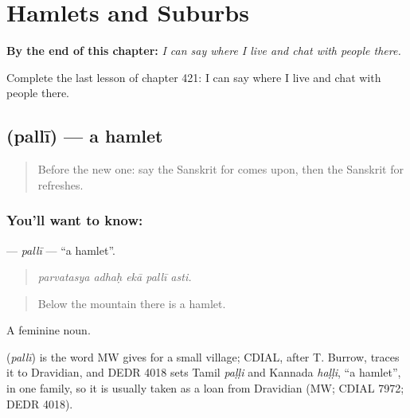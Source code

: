 
\chapter{Hamlets and Suburbs}
\label{ch:sa-hamlets-and-suburbs}

\begin{chapteropening}
\textbf{By the end of this chapter:} \emph{I can say where I live and chat with people there.}

Complete the last lesson of chapter 421: I can say where I live and chat with people there.
\end{chapteropening}

\section[\texorpdfstring{\sk{पल्ली} (pallī)}{पल्ली (pallī)}]{ (pallī) — a hamlet}

\label{lesson:SA-C421-palli}



\begin{quote}
Before the new one: say the Sanskrit for comes upon, then the Sanskrit for refreshes.
\end{quote}

\subsection*{You'll want to know: }
\textbf{} — \emph{pallī} — \textquotedblleft{}a hamlet\textquotedblright{}.

\begin{quote}
    
\end{quote}

\begin{quote}
\emph{parvatasya adhaḥ ekā pallī asti.}
\end{quote}

\begin{quote}
Below the mountain there is a hamlet.
\end{quote}

A feminine noun.

\begin{cousinweb}
\textbf{} (\emph{pallī}) is the word MW gives for a small village; CDIAL, after T. Burrow, traces it to Dravidian, and DEDR 4018 sets Tamil \emph{paḷḷi} and Kannada \emph{haḷḷi}, \textquotedblleft{}a hamlet\textquotedblright{}, in one family, so it is usually taken as a loan from Dravidian (MW; CDIAL 7972; DEDR 4018).
\end{cousinweb}


